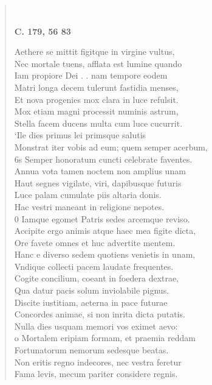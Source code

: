 \documentclass[11pt, a4paper]{report}
\begin{document}
\begin{verse}
        ﻿\pagebreak 
    \begin{center} \textbf{C. 179, 56 83} \end{center} \marginpar{[187]} Aethere se mittit figitque in virgine vultus, \\ Nec mortale tuens, afflata est lumine quando \\ Iam propiore Dei . . nam tempore eodem \\ Matri longa decem tulerunt fastidia menses, \\ Et nova progenies mox clara in luce refulsit. \\ Mox etiam magni processit numinis astrum, \\ Stella facem ducens multa cum luce cucurrit. \\ ‘Ile dies primus lei primsque salutis \\ Monstrat iter vobis ad eum; quem semper acerbum, \\ 6s Semper honoratum cuncti celebrate faventes. \\ Annua vota tamen noctem non amplius unam \\ Haut segnes vigilate, viri, dapibusque futuris \\ Luce palam cumulate piis altaria donis. \\ Hac vestri maneant in religione nepotes. \\ 0 Iamque egomet Patris sedes arcemque reviso. \\ Accipite ergo animis atque haec mea figite dicta, \\ Ore favete omnes et huc advertite mentem. \\  \lbrack Hanc \rbrack  e diverso sedem quotiens venietis in unam, \\ Vndique collecti pacem laudate frequentes. \\ Cogite concilium, coeant in foedera dextrae, \\ Qua datur pacis solum inviolabile pignus. \\ Discite iustitiam, aeterna in pace futurae \\ Concordes animae, si non inrita dicta putatis. \\ Nulla dies usquam memori vos eximet aevo: \\ o Mortalem eripiam formam, et praemia reddam \\ Fortunatorum nemorum sedesque beatas. \\ Non eritis regno indecores, nec vestra feretur \\ Fama levis, mecum pariter considere regnis. \\ 

\end{verse}
\end{document}
